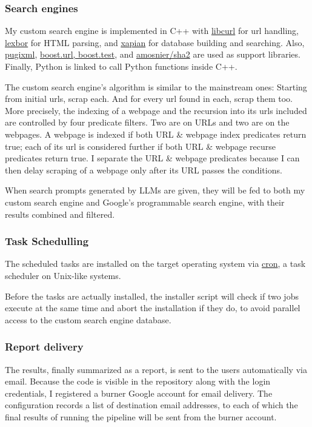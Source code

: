 \documentclass[final-report]{report-template}
\begin{document}
\subsubsection{Search engines}
My custom search engine is implemented in C++ with
\href{https://curl.se/libcurl/}{\ttfamily libcurl} for url handling,
\href{https://lexbor.com/}{\ttfamily lexbor} for HTML parsing, and
\href{https://xapian.org/docs/}{\ttfamily xapian} for database building and
searching. Also, \href{https://pugixml.org/}{\ttfamily pugixml},
\href{https://www.boost.org/}{\ttfamily boost.url, boost.test}, and
\href{https://github.com/amosnier/sha-2}{\ttfamily amosnier/sha2} are used as
support libraries. Finally, Python is linked to call Python functions inside
C++.

The custom search engine's algorithm is similar to the mainstream ones:
Starting from initial urls, scrap each. And for every url found in each, scrap
them too.  More precisely, the indexing of a webpage and the recursion into its
urls included are controlled by four predicate filters. Two are on URLs and two
are on the webpages. A webpage is indexed if both URL \& webpage index
predicates return true; each of its url is considered further if both URL \&
webpage recurse predicates return true. I separate the URL \& webpage
predicates because I can then delay scraping of a webpage only after its URL
passes the conditions.

When search prompts generated by LLMs are given, they will be fed to both my
custom search engine and Google's programmable search engine, with their
results combined and filtered.

\subsubsection{Task Schedulling}
The scheduled tasks are installed on the target operating system via
\href{https://en.wikipedia.org/wiki/Cron}{cron}, a task scheduler on Unix-like
systems.

Before the tasks are actually installed, the installer script will check if two
jobs execute at the same time and abort the installation if they do, to avoid
parallel access to the custom search engine database.

\subsubsection{Report delivery} 
The results, finally summarized as a report, is sent to the users automatically
via email. Because the code is visible in the repository along with the login
credentials, I registered a burner Google account for email delivery. The
configuration records a list of destination email addresses, to each of which
the final results of running the pipeline will be sent from the burner account.
\end{document}
